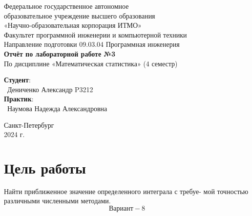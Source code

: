 \documentclass{article}
\begin{document}
\begin{center}
    \Large
    Федеральное государственное автономное \\
    образовательное учреждение высшего образования \\ 
    «Научно-образовательная корпорация ИТМО»\\
    \vspace{0.5cm}
    \large
    Факультет программной инженерии и компьютерной техники \\
    Направление подготовки 09.03.04 Программная инженерия \\
    \vspace{1cm}
    \Large
    \textbf{Отчёт по лабораторной работе №3} \\
    По дисциплине «Математическая статистика» (4 семестр)\\
    \large
    \vspace{8cm}

    \begin{minipage}{.33\textwidth}
    \end{minipage}
    \hfill
    \begin{minipage}{.4\textwidth}
    
        \textbf{Студент}: \vspace{.1cm} \\
        \ Дениченко Александр P3212\\
        \textbf{Практик}:  \\
        \ Наумова Надежда Александровна
    \end{minipage}
    \vfill
Санкт-Петербург\\ 2024 г.
\end{center}
\pagestyle{empty}
\newpage
\pagestyle{plain}
\section{Цель работы}
Найти приближенное значение определенного интеграла с требуе-
мой точностью различными численными методами.
\[\text{Вариант} - 8\]
\end{document}
